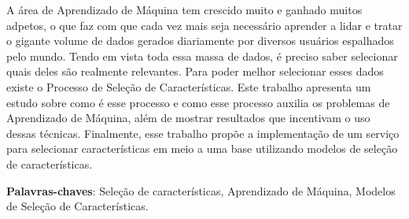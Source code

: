\begin{resumo}
A área de Aprendizado de Máquina tem crescido muito e ganhado muitos adpetos, o que faz com que cada vez mais seja necessário aprender a lidar e tratar o gigante volume de dados gerados diariamente por diversos usuários espalhados pelo mundo. Tendo em vista toda essa massa de dados, é preciso saber selecionar quais deles são realmente relevantes. Para poder melhor selecionar esses dados existe o Processo de Seleção de Características. Este trabalho apresenta um estudo sobre como é esse processo e como esse processo auxilia os problemas de Aprendizado de Máquina, além de mostrar resultados que incentivam o uso dessas técnicas. Finalmente, esse trabalho propõe a implementação de um serviço para selecionar características em meio a uma base utilizando modelos de seleção de características.

 \vspace{\onelineskip}
    
 \noindent
 \textbf{Palavras-chaves}: Seleção de características, Aprendizado de Máquina, Modelos de 
 Seleção de Características.
\end{resumo}
